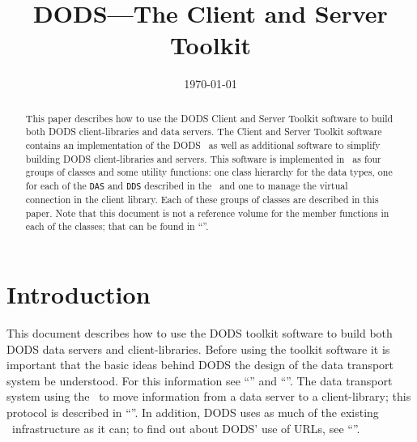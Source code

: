 
%
%







\title{DODS---The Client and Server Toolkit} 
\author{}
\date{\today}

\maketitle

\begin{abstract}
  
  This paper describes how to use the DODS Client and Server Toolkit software
  to build both DODS client-libraries and data servers. The Client and Server
  Toolkit software contains an implementation of the DODS \Dap\ as well as
  additional software to simplify building DODS client-libraries and servers.
  This software is implemented in \Cpp\ as four groups of classes and some
  utility functions: one class hierarchy for the data types, one for each of
  the {\tt DAS} and {\tt DDS} described in the \dap\ and one to manage the
  virtual connection in the client library.  Each of these groups of classes
  are described in this paper. Note that this document is not a reference
  volume for the member functions in each of the classes; that can be found
  in ``\TKR''.

\end{abstract}


 

\begin{htmlonly}
\end{htmlonly}

\clearpage

\tableofcontents

\clearpage

\section{Introduction}

This document describes how to use the DODS toolkit software to build both
DODS data servers and client-libraries. Before using the toolkit software it
is important that the basic ideas behind DODS the design of the data
transport system be understood. For this information see ``\DDA'' and
``\DDD''. The data transport system using the \dap\ to move information from
a data server to a client-library; this protocol is described in ``\DAP''. In
addition, DODS uses as much of the existing \www\ infrastructure as it can;
to find out about DODS' use of URLs, see ``\URL''.

